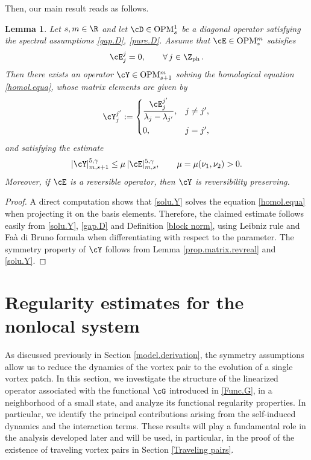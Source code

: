 \documentclass[a4paper,reqno,10pt]{article}
\newtheorem{lem}{Lemma}[section]
\newcommand{\OpM}{{\rm O}{\rm P}{\rm M}}
\begin{document}
Then, our main result reads as follows.
\begin{lem}\label{lemma.sol.hom}
Let $s,m\in\R$ and let $\cD\in \OpM_{s}^{1}$ be a diagonal operator satisfying the spectral assumptions \eqref{gap.D}, \eqref{pure.D}. 
Assume that $\cE\in \OpM_{s}^{m}$ satisfies
\[
\cE_{j}^{j}=0,
\qquad \forall\, j\in\Z_{\rm ph} \,.
\]
Then there exists an operator $\cY\in \OpM_{s+1}^{m}$ solving the homological equation \eqref{homol.equa}, whose matrix elements are given by
\begin{equation}\label{solu.Y}
\cY_{j}^{j'}
:=
\begin{cases}
\displaystyle
\frac{\cE_{j}^{j'}}{\lambda_{j}-\lambda_{j'}},
& j\neq j',
\\[0.3cm]
0,
& j=j',
\end{cases}
\end{equation}
and satisfying the estimate
\begin{equation}
|\cY|_{m,s+1}^{5,\gamma}
\leq
\mu\, |\cE|_{m,s}^{5,\gamma},
\qquad
\mu=\mu(\nu_{1},\nu_{2})>0.
\end{equation}
Moreover, if  $\cE$ is a reversible operator, then $\cY$ is reversibility preserving.
\end{lem}


\begin{proof}
	A direct computation shows that \eqref{solu.Y} solves the equation \eqref{homol.equa} when projecting it on the basis elements.
	Therefore, the claimed  estimate follows easily from \eqref{solu.Y}, \eqref{gap.D} and Definition \ref{block norm}, using Leibniz rule and Fa\`a di Bruno formula 
    when differentiating with respect to the parameter. The symmetry property of $\cY$ follows from Lemma \ref{prop.matrix.revreal} and \eqref{solu.Y}.
\end{proof}






\section{Regularity estimates for the nonlocal system}\label{Ref-VP}
As discussed previously in Section \ref{model.derivation}, the symmetry assumptions allow us to reduce the dynamics of the vortex pair to the evolution of a single vortex patch.
In this section, we investigate the structure of the linearized operator associated with the functional \(\cG\) introduced in \eqref{Func.G}, in a neighborhood of a small state, and analyze its functional regularity properties. In particular, we identify the principal contributions arising from the self-induced dynamics and the interaction terms. These results will play a fundamental role in the analysis developed later and will be used, in particular, in the proof of the existence of traveling vortex pairs in Section \ref{Traveling pairs}.
\end{document}
